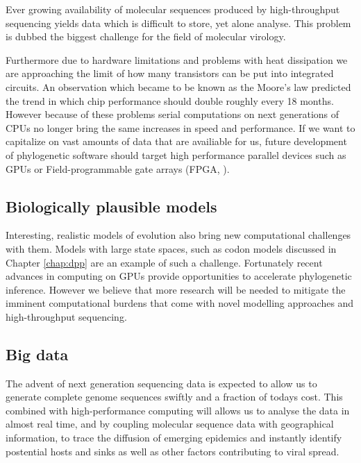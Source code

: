Ever growing availability of molecular sequences produced by high-throughput sequencing yields data which is difficult to store, yet alone analyse.
This problem is dubbed the biggest challenge for the field of molecular virology. %

Furthermore due to hardware limitations and problems with heat dissipation we are approaching the limit of how many transistors can be put into integrated circuits.
An observation which became to be known as the Moore's law predicted the trend in which chip performance should double roughly every 18 months.
However because of these problems serial computations on next generations of CPUs no longer bring the same increases in speed and performance.
If we want to capitalize on vast amounts of data that are availiable for us, future development of phylogenetic software should target high performance parallel devices such as GPUs \citep{Nickolls2008} or Field-programmable gate arrays (FPGA, \citet{Kuon2008}).

\subsection{Biologically plausible models}

Interesting, realistic models of evolution also bring new computational challenges with them.
Models with large state spaces, such as codon models discussed in Chapter \ref{chap:dpp} are an example of such a challenge.
Fortunately recent advances in computing on GPUs \citep{Ayres2012} provide opportunities to accelerate phylogenetic inference.
However we believe that more research will be needed to mitigate the imminent computational burdens that come with novel modelling approaches and high-throughput sequencing. 

\subsection{Big data}

The advent of next generation sequencing data is expected to allow us to generate complete genome sequences swiftly and a fraction of todays cost.
This combined with high-performance computing will allows us to analyse the data in almost real time, and by coupling molecular sequence data with geographical information, to trace the diffusion of emerging epidemics and instantly identify postential hosts and sinks as well as other factors contributing to viral spread.   























